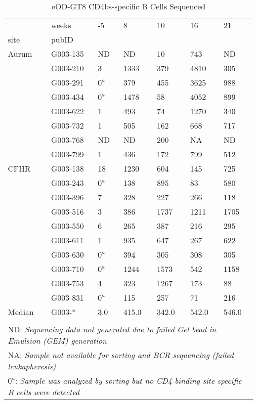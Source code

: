 \documentclass{article}
\begin{document}
    \begin{table}
\centering
\caption{eOD-GT8 CD4bs-specific B Cells Sequenced}
\begin{tabular}{lllllll}
\toprule
       & weeks &     -5 &      8 &     10 &     16 &     21 \\
site & pubID &        &        &        &        &        \\
\midrule
Aurum & G003-135 &  ND &  ND &  10 &  743 &  ND \\
       & G003-210 &  3 &  1333 &  379 &  4810 &  305 \\
       & G003-291 &  $0^a$ &  379 &  455 &  3625 &  988 \\
       & G003-434 &  $0^a$ &  1478 &  58 &  4052 &  899 \\
       & G003-622 &  1 &  493 &  74 &  1270 &  340 \\
       & G003-732 &  1 &  505 &  162 &  668 &  717 \\
       & G003-768 &  ND &  ND &  200 &  NA &  ND \\
       & G003-799 &  1 &  436 &  172 &  799 &  512 \\
\midrule
CFHR & G003-138 &  18 &  1230 &  604 &  145 &  725 \\
       & G003-243 &  $0^a$ &  138 &  895 &  83 &  580 \\
       & G003-396 &  7 &  328 &  227 &  266 &  118 \\
       & G003-516 &  3 &  386 &  1737 &  1211 &  1705 \\
       & G003-550 &  6 &  265 &  387 &  216 &  295 \\
       & G003-611 &  1 &  935 &  647 &  267 &  622 \\
       & G003-630 &  $0^a$ &  394 &  305 &  308 &  305 \\
       & G003-710 &  $0^a$ &  1244 &  1573 &  542 &  1158 \\
       & G003-753 &  4 &  323 &  1267 &  173 &  88 \\
       & G003-831 &  $0^a$ &  115 &  257 &  71 &  216 \\
\midrule
Median & G003-* &  3.0 &  415.0 &  342.0 &  542.0 &  546.0 \\
\bottomrule
\multicolumn{7}{l}{\tiny } \\
\multicolumn{7}{l}{\tiny ND: \textit{Sequencing data not generated due to failed Gel bead in Emulsion (GEM) generation}} \\
\multicolumn{7}{l}{\tiny NA: \textit{Sample not available for sorting and BCR sequencing (failed leukapheresis)}} \\
\multicolumn{7}{l}{\tiny $0^a$: \textit{Sample was analyzed by sorting but no CD4 binding site-specific B cells were detected}} \\
\end{tabular}
\end{table}
\end{document}
